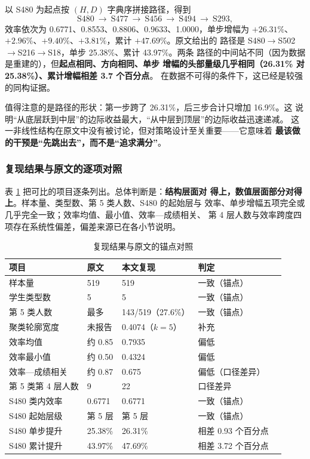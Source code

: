 以 S480 为起点按 $(H,D)$ 字典序拼接路径，得到
\begin{equation}
\text{S480}\ \longrightarrow\ \text{S477}\ \longrightarrow\
\text{S456}\ \longrightarrow\ \text{S494}\ \longrightarrow\ \text{S293},
\label{eq:path}
\end{equation}
效率依次为 0.6771、0.8553、0.8806、0.9633、1.0000，单步增幅为
$+26.31\%$、$+2.96\%$、$+9.40\%$、$+3.81\%$，累计 $+47.69\%$。原文给出的
路径是 S480$\to$S502$\to$S216$\to$S18，单步 25.38\%、累计 43.97\%。两条
路径的中间站不同（因为数据是重建的），但\textbf{起点相同、方向相同、单步
增幅的头部量级几乎相同（26.31\% 对 25.38\%）、累计增幅相差 3.7 个百分点}。
在数据不可得的条件下，这已经是较强的同构证据。

值得注意的是路径的形状：第一步跨了 26.31\%，后三步合计只增加 16.9\%。这
说明“从底层跃到中层”的边际收益最大，“从中层到顶层”的边际收益迅速递减。
这一非线性结构在原文中没有被讨论，但对策略设计至关重要——它意味着\textbf{
最该做的干预是“先跳出去”，而不是“追求满分”}。

\subsubsection{复现结果与原文的逐项对照}

表 \ref{tab:repro} 把可比的项目逐条列出。总体判断是：\textbf{结构层面对
得上，数值层面部分对得上}。样本量、类型数、第 5 类人数、S480 的起始层与
效率、单步增幅五项完全或几乎完全一致；效率均值、最小值、效率—成绩相关、
第 4 层人数与效率跨度四项存在系统性偏差，偏差来源已在各小节说明。

\begin{table}[htbp]
\centering
\tabfont
\caption{复现结果与原文的锚点对照}
\label{tab:repro}
\begin{tabular}{@{}lllll@{}}
\toprule
项目 & 原文 & 本文复现 & 判定 \\
\midrule
样本量 & 519 & 519 & 一致（锚点） \\
学生类型数 & 5 & 5 & 一致（锚点） \\
第 5 类人数 & 最多 & 143/519（27.6\%） & 一致（锚点） \\
聚类轮廓宽度 & 未报告 & 0.4074（$k=5$） & 补充 \\
效率均值 & 约 0.85 & 0.7935 & 偏低 \\
效率最小值 & 约 0.50 & 0.4324 & 偏低 \\
效率—成绩相关 & 约 0.87 & 0.675 & 偏低（口径差异） \\
第 5 类第 4 层人数 & 9 & 22 & 口径差异 \\
S480 类内效率 & 0.6771 & 0.6771 & 一致（锚点） \\
S480 起始层级 & 第 5 层 & 第 5 层 & 一致（锚点） \\
S480 单步提升 & 25.38\% & 26.31\% & 相差 0.93 个百分点 \\
S480 累计提升 & 43.97\% & 47.69\% & 相差 3.72 个百分点 \\
\bottomrule
\end{tabular}
\end{table}

